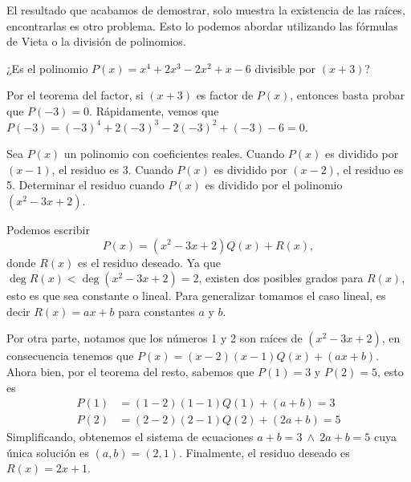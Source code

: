 El resultado que acabamos de demostrar, solo muestra la existencia de las raíces, encontrarlas es otro problema.
Esto lo podemos abordar utilizando las fórmulas de Vieta o la división de polinomios.

\begin{example}
    ¿Es el polinomio $P(x) = x^4 + 2x^3 - 2x^2 + x - 6$ divisible por $(x + 3)$?
\end{example}
\begin{solution}
    Por el teorema del factor, si $(x + 3)$ es factor de $P(x)$, entonces basta probar que $P(-3) = 0$.
    Rápidamente, vemos que $P(-3) = (-3)^4 + 2(-3)^3 - 2(-3)^2 + (-3) - 6 = 0$.
\end{solution}

\begin{example}
    Sea $P(x)$ un polinomio con coeficientes reales.
    Cuando $P(x)$ es dividido por $(x - 1)$, el residuo es 3.
    Cuando $P(x)$ es dividido por $(x - 2)$, el residuo es 5.
    Determinar el residuo cuando $P(x)$ es dividido por el polinomio $(x^2 - 3x + 2)$.
\end{example}
\begin{solution}
    Podemos escribir
    \[
        P(x) = (x^2 - 3x + 2)Q(x) + R(x),
    \]
    donde $R(x)$ es el residuo deseado.
    Ya que $\deg R(x) < \deg(x^2 - 3x + 2) =  2$, existen dos posibles grados para $R(x)$, esto es que sea constante o lineal.
    Para generalizar tomamos el caso lineal, es decir $R(x) = ax + b$ para constantes $a$ y $b$.

    Por otra parte, notamos que los números 1 y 2 son raíces de $(x^2 - 3x + 2)$, en consecuencia tenemos que $P(x) = (x - 2)(x - 1)Q(x) + (ax + b)$.
    Ahora bien, por el teorema del resto, sabemos que $P(1) = 3$ y $P(2) = 5$, esto es
    \begin{align*}
        P(1) &= (1 - 2)(1 - 1)Q(1) + (a + b) = 3\\
        P(2) &= (2 - 2)(2 - 1)Q(2) + (2a + b) = 5
    \end{align*}
    Simplificando, obtenemos el sistema de ecuaciones $a + b = 3\ \land\ 2a + b  = 5$ cuya única solución es $(a, b) = (2, 1)$.
    Finalmente, el residuo deseado es $\boxed{R(x) = 2x + 1}$.
\end{solution}

